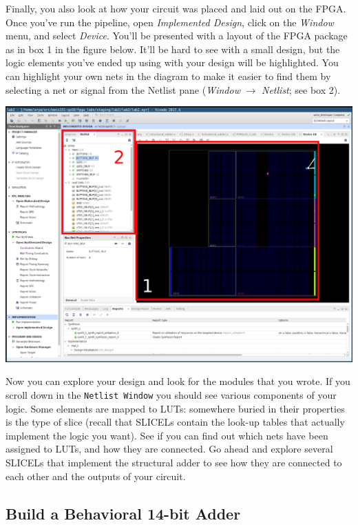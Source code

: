 \documentclass[11pt]{article}
\begin{document}
Finally, you also look at how your circuit was placed and laid out on the FPGA. Once you've run the pipeline, open \emph{Implemented Design}, click on the \emph{Window} menu, and select \emph{Device}. You'll be presented with a layout of the FPGA package as in box 1 in the figure below. It'll be hard to see with a small design, but the logic elements you've ended up using with your design will be highlighted. You can highlight your own nets in the diagram to make it easier to find them by selecting a net or signal from the Netlist pane (\emph{Window} $\rightarrow$ \emph{Netlist}; see box 2).

\begin{center}
  \includegraphics[width=\textwidth]{figs/fpga_layout.png}
\end{center}

Now you can explore your design and look for the modules that you wrote. If you scroll down in the \verb|Netlist Window| you should see various components of your logic. Some elements are mapped to LUTs: somewhere buried in their properties is the type of slice (recall that SLICELs contain the look-up tables that actually implement the logic you want). See if you can find out which nets have been assigned to LUTs, and how they are connected. Go ahead and explore several SLICELs that implement the structural adder to see how they are connected to each other and the outputs of your circuit.

\subsection{Build a Behavioral 14-bit Adder}
\end{document}
